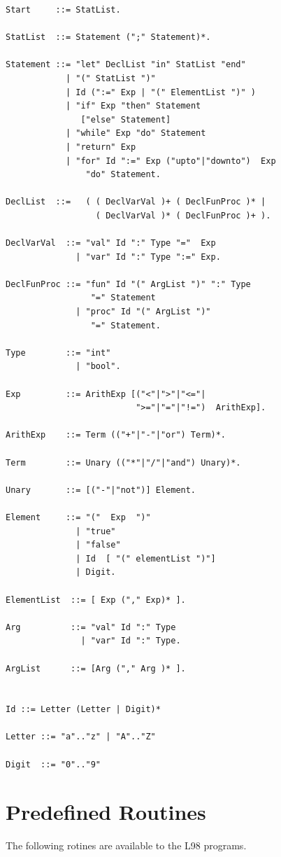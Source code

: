 \documentclass[a4paper, 11pt]{report}
\begin{document}
\begin{verbatim}
Start     ::= StatList.

StatList  ::= Statement (";" Statement)*.

Statement ::= "let" DeclList "in" StatList "end"
            | "(" StatList ")"
            | Id (":=" Exp | "(" ElementList ")" )
            | "if" Exp "then" Statement
               ["else" Statement]
            | "while" Exp "do" Statement
            | "return" Exp
            | "for" Id ":=" Exp ("upto"|"downto")  Exp
                "do" Statement.

DeclList  ::=   ( ( DeclVarVal )+ ( DeclFunProc )* | 
                  ( DeclVarVal )* ( DeclFunProc )+ ).
  
DeclVarVal  ::= "val" Id ":" Type "="  Exp
              | "var" Id ":" Type ":=" Exp.

DeclFunProc ::= "fun" Id "(" ArgList ")" ":" Type
                 "=" Statement
              | "proc" Id "(" ArgList ")"
                 "=" Statement.

Type        ::= "int"
              | "bool".

Exp         ::= ArithExp [("<"|">"|"<="|
                          ">="|"="|"!=")  ArithExp].
    
ArithExp    ::= Term (("+"|"-"|"or") Term)*.

Term        ::= Unary (("*"|"/"|"and") Unary)*.

Unary       ::= [("-"|"not")] Element.

Element     ::= "("  Exp  ")"
              | "true"
              | "false"
              | Id  [ "(" elementList ")"]
              | Digit.

ElementList  ::= [ Exp ("," Exp)* ].

Arg          ::= "val" Id ":" Type
               | "var" Id ":" Type.

ArgList      ::= [Arg ("," Arg )* ].


Id ::= Letter (Letter | Digit)*

Letter ::= "a".."z" | "A".."Z"

Digit  ::= "0".."9"

\end{verbatim}



\section{Predefined Routines}
\label{sct:routines}
The following rotines are available to the L98 programs.
\end{document}
